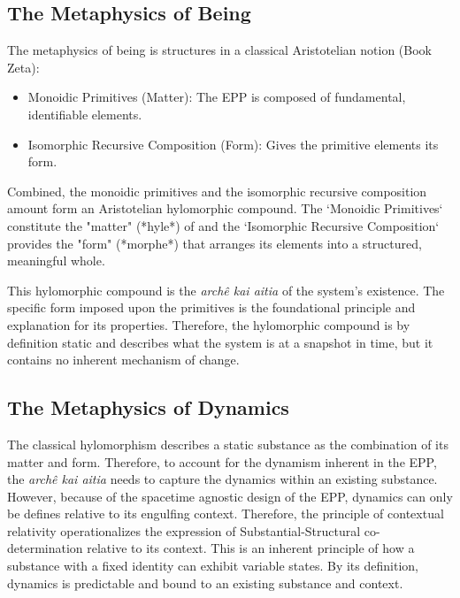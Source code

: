 \subsection{The Metaphysics of Being} 
\label{sec:metaphysics_being}

The metaphysics of being is structures in a classical Aristotelian notion (Book Zeta\cite{furth1985metaphysics}): 

\begin{itemize}
	\item Monoidic Primitives (Matter): The EPP is composed of fundamental, identifiable elements.
	\item Isomorphic Recursive Composition (Form): Gives the primitive elements its form. 
\end{itemize}

Combined, the monoidic primitives and the isomorphic recursive composition amount form an Aristotelian hylomorphic compound. The `Monoidic Primitives` constitute the "matter" (*hyle*) of and the `Isomorphic Recursive Composition` provides the "form" (*morphe*) that arranges its elements into a structured, meaningful whole.

This hylomorphic compound is the  \textit{archê kai aitia} of the system's existence. The specific form imposed upon the primitives is the foundational principle and explanation for its properties. Therefore, the hylomorphic compound is by definition static and describes what the system is at a snapshot in time, but it contains no inherent mechanism of change. 

\subsection{The Metaphysics of Dynamics} 
\label{sec:metaphysics_dynamics}

The classical hylomorphism describes a static substance as the combination of its matter and form. Therefore, to account for the dynamism inherent in the EPP, the \textit{archê kai aitia} needs to capture the dynamics within an existing substance. However, because of the spacetime agnostic design of the EPP, dynamics can only be defines relative to its engulfing context. Therefore, the principle of contextual relativity operationalizes the expression of Substantial-Structural co-determination relative to its context. This is an inherent  principle of how a substance with a fixed identity can exhibit variable states. By its definition, dynamics is predictable and bound to an existing substance and context. 

